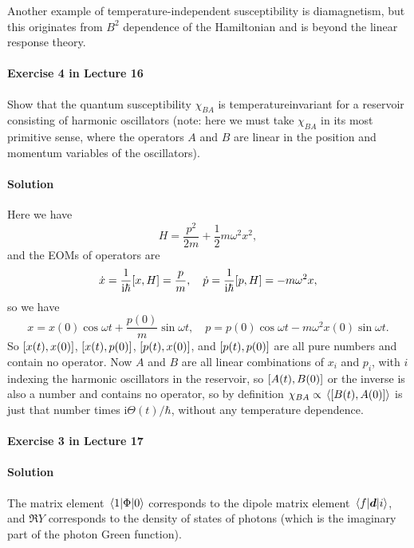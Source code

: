 \documentclass[hyperref, a4paper]{article}
\newcommand*{\ii}{\mathrm{i}}
\begin{document}
Another example of temperature-independent susceptibility is diamagnetism,
but this originates from $B^2$ dependence of the Hamiltonian 
and is beyond the linear response theory.

\paragraph{Exercise 4 in Lecture 16} Show that the quantum susceptibility $\chi_{B A}$ is temperatureinvariant for a reservoir consisting of harmonic oscillators (note: here we must take $\chi_{B A}$ in its most primitive sense, where the operators $A$ and $B$ are linear in the position and momentum variables of the oscillators).

\paragraph{Solution} Here we have 
\begin{equation}
    H = \frac{p^2}{2m} + \frac{1}{2} m \omega^2 x^2,
\end{equation}
and the EOMs of operators are 
\begin{equation}
    \dot{x} = \frac{1}{\ii \hbar} \comm{x}{H} = \frac{p}{m}, \quad 
    \dot{p} = \frac{1}{\ii \hbar} \comm{p}{H} = - m \omega^2 x,
\end{equation}
so we have 
\begin{equation}
    x = x(0) \cos \omega t + \frac{p(0)}{m} \sin \omega t, \quad 
    p = p(0) \cos \omega t - m \omega^2 x(0) \sin \omega t.
\end{equation}
So $\comm{x(t)}{x(0)}$, $\comm{x(t)}{p(0)}$, $\comm{p(t)}{x(0)}$, and $\comm{p(t)}{p(0)}$
are all pure numbers and contain no operator.
Now $A$ and $B$ are all linear combinations of $x_i$ and $p_i$,
with $i$ indexing the harmonic oscillators in the reservoir,
so $\comm{A(t)}{B(0)}$ or the inverse is also a number and contains no operator,
so by definition $\chi_{BA} \propto \expval*{\comm{B(t)}{A(0)}}$ 
is just that number times $\ii \Theta(t) / \hbar$, 
without any temperature dependence.

\paragraph{Exercise 3 in Lecture 17}

\paragraph{Solution} The matrix element $\mel{1}{\Phi}{0}$ corresponds to the 
dipole matrix element $\mel{f}{\vb*{d}}{i}$,
and $\Re Y$ corresponds to the density of states of photons
(which is the imaginary part of the photon Green function).
\end{document}
